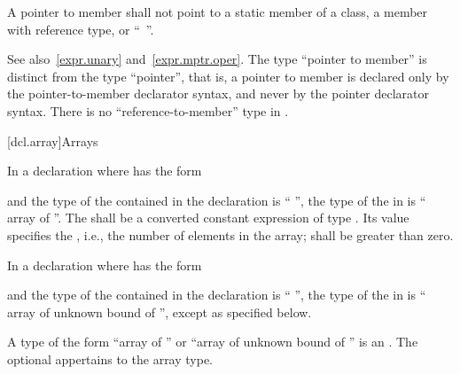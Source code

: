 \pnum
A pointer to member shall not point to a static member
of a class,
a member with reference type,
or
``\cv{}~''.

\pnum
\begin{note}
See also~\ref{expr.unary} and~\ref{expr.mptr.oper}.
The type ``pointer to member'' is distinct from the type ``pointer'',
that is, a pointer to member is declared only by the pointer-to-member
declarator syntax, and never by the pointer declarator syntax.
There is no ``reference-to-member'' type in \Cpp{}.
\end{note}

[dcl.array]{Arrays}%

\pnum
In a declaration   where  has the form
\begin{ncsimplebnf}
 \terminal{[}  \terminal{]} 
\end{ncsimplebnf}
and the type of the contained 
in the declaration  
is `` '',
the type of the  in  is
`` array of  ''.
The 
shall be a converted constant expression of type .
%
Its value  specifies the ,
i.e., the number of elements in the array;
 shall be greater than zero.

\pnum
In a declaration   where  has the form
\begin{ncsimplebnf}
 
\end{ncsimplebnf}
and the type of the contained 
in the declaration  
is `` '',
the type of the  in  is
`` array of unknown bound of '', except as specified below.

\pnum
{}%
\label{term.array.type}%
A type of the form ``array of  '' or
``array of unknown bound of '' is an .
The optional 
appertains to the array type.

